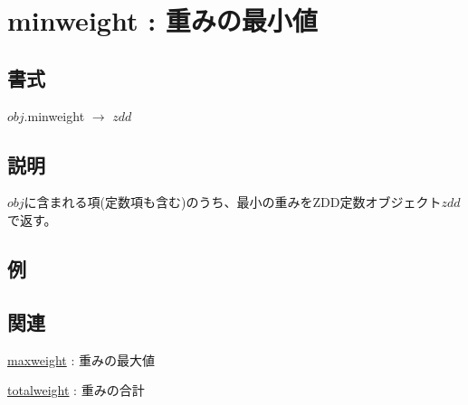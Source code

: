
\section{minweight : 重みの最小値\label{sect:minweight}}
\subsection*{書式}
$obj$.minweight $\rightarrow$ $zdd$

\subsection*{説明}
$obj$に含まれる項(定数項も含む)のうち、最小の重みをZDD定数オブジェクト$zdd$で返す。


\subsection*{例}


\subsection*{関連}
\hyperref[sect:maxweight]{maxweight} : 重みの最大値

\hyperref[sect:totalweight]{totalweight} : 重みの合計

